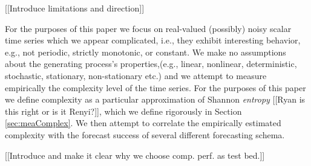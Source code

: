[[Introduce limitations and direction]]

For the purposes of this paper we focus on real-valued (possibly) noisy scalar time series which we appear complicated, i.e., they exhibit interesting behavior, e.g., not periodic, strictly monotonic, or constant. We make no assumptions about the generating process's properties,(e.g., linear, nonlinear, deterministic, stochastic, stationary, non-stationary etc.) and we attempt to measure empirically the complexity level of the time series.  For the purposes of this paper we define complexity as a particular approximation of Shannon \emph{entropy} [[Ryan is this right or is it Renyi?]], which we define rigorously in Section \ref{sec:meaComplex}. We then attempt to correlate the empirically estimated complexity with the forecast success of several different forecasting schema. 


[[Introduce and make it clear why we choose comp. perf. as test bed.]]


